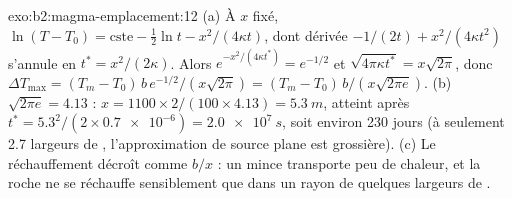 \begin{solution}{exo:b2:magma-emplacement:12}
(a) À $x$ fixé, $\ln(T - T_0) = \text{cste} - \frac12\ln t - x^2/(4\kappa t)$, dont
dérivée $-1/(2t) + x^2/(4\kappa t^2)$ s'annule en $t^* = x^2/(2\kappa)$. Alors
$e^{-x^2/(4\kappa t^*)} = e^{-1/2}$ et $\sqrt{4\pi\kappa t^*} = x\sqrt{2\pi}$, donc $\Delta
T_{\max} = (T_m - T_0)\,b\,e^{-1/2}/(x\sqrt{2\pi}) = (T_m - T_0)\,b/(x\sqrt{2\pi e})$. (b)
$\sqrt{2\pi e} = 4.13$ : $x = 1100\times2/(100\times4.13) = \qty{5.3}{m}$, atteint après
$t^* = 5.3^2/(2\times\num{0.7e-6}) = \qty{2.0e7}{s}$, soit environ 230 jours (à seulement 2.7
largeurs de , l'approximation de source plane est grossière). (c) Le réchauffement décroît
comme $b/x$ : un  mince transporte peu de chaleur, et la roche ne se réchauffe sensiblement
que dans un rayon de quelques largeurs de .
\end{solution}

